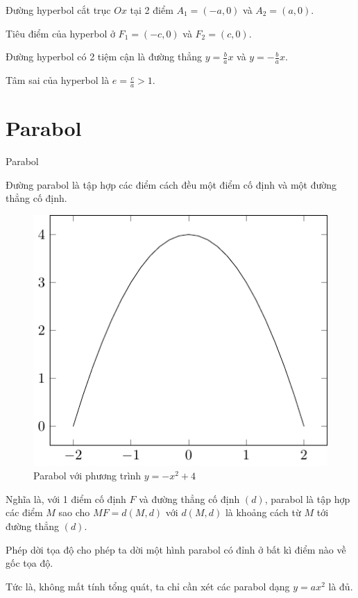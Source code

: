 Đường hyperbol cắt trục $Ox$ tại 2 điểm $A_1 = (-a, 0)$ và $A_2 = (a, 0)$.

Tiêu điểm của hyperbol ở $F_1 = (-c, 0)$ và $F_2 = (c, 0)$.

Đường hyperbol có 2 tiệm cận là đường thẳng $y = \frac{b}{a} x$ và $y = -\frac{b}{a} x$.

Tâm sai của hyperbol là $e = \frac{c}{a} > 1$.

\section{Parabol}

\begin{defblock}{Parabol}

    Đường parabol là tập hợp các điểm cách đều một điểm cố định và một đường thẳng cố định.

\end{defblock}

\begin{figure}[ht]
    \centering
    \includegraphics{pics/conics/parabola.pdf}
    \caption{Parabol với phương trình $y = -x^2 + 4$}
\end{figure}

Nghĩa là, với 1 điểm cố định $F$ và đường thẳng cố định $(d)$, parabol là tập hợp các điểm $M$ sao cho $MF = d(M, d)$ với $d(M, d)$ là khoảng cách từ $M$ tới đường thẳng $(d)$.

Phép dời tọa độ cho phép ta dời một hình parabol có đỉnh ở bất kì điểm nào về gốc tọa độ.

Tức là, không mất tính tổng quát, ta chỉ cần xét các parabol dạng $y=ax^2$ là đủ.

